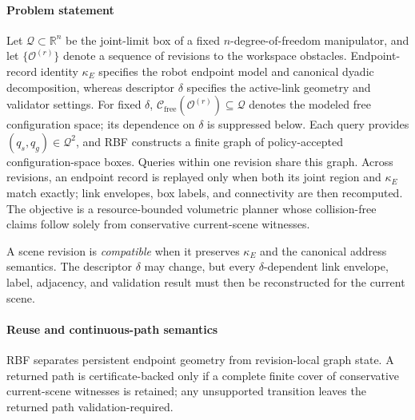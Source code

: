 \documentclass[journal]{IEEEtran}
\newcommand{\rbf}{RBF}
\newcommand{\Real}{\ensuremath{\mathbb{R}}}
\newcommand{\Cfree}{\ensuremath{\mathcal{C}_{\mathrm{free}}}}
\newcommand{\calO}{\ensuremath{\mathcal{O}}}
\newcommand{\Q}{\ensuremath{\mathcal{Q}}}
\begin{document}
\paragraph{Problem statement}
Let $\Q\subset\Real^n$ be the joint-limit box of a fixed
$n$-degree-of-freedom manipulator, and let $\{\calO^{(r)}\}$ denote a sequence
of revisions to the workspace obstacles. Endpoint-record identity $\kappa_E$ specifies
the robot endpoint model and canonical dyadic decomposition, whereas descriptor
$\delta$ specifies the active-link geometry and validator settings. For fixed
$\delta$, $\Cfree(\calO^{(r)})\subseteq\Q$ denotes the modeled free
configuration space; its dependence on $\delta$ is suppressed below. Each query
provides $(q_s,q_g)\in\Q^2$, and \rbf{} constructs a finite graph of
policy-accepted configuration-space boxes. Queries within one revision share
this graph. Across revisions, an endpoint record is replayed only when both its
joint region and $\kappa_E$ match exactly; link envelopes, box labels, and
connectivity are then recomputed. The objective is a resource-bounded
volumetric planner whose collision-free claims follow solely from conservative
current-scene witnesses.

A scene revision is \emph{compatible} when it preserves $\kappa_E$ and the
canonical address semantics. The descriptor $\delta$ may change, but every
$\delta$-dependent link envelope, label, adjacency, and validation result must
then be reconstructed for the current scene.

\paragraph{Reuse and continuous-path semantics}
\rbf{} separates persistent endpoint geometry from revision-local graph state.
A returned path is certificate-backed only if a complete finite cover of
conservative current-scene witnesses is retained; any unsupported transition
leaves the returned path validation-required.
\end{document}
